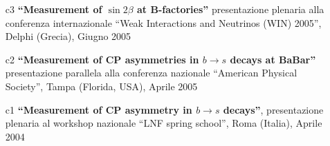 \documentclass[11pt,twoside,a4paper]{article}
\begin{document}
\begin{enumerate}
\item [c3] \textbf{``Measurement of $\sin 2\beta$ at B-factories''}
  presentazione plenaria alla conferenza internazionale ``Weak
  Interactions and Neutrinos (WIN) 2005'', Delphi (Grecia), Giugno
  2005
  \vspace{1mm}

\item [c2] \textbf{``Measurement of CP asymmetries in $b \rightarrow s$
  decays at BaBar''} presentazione parallela alla conferenza
  nazionale ``American Physical Society'', Tampa (Florida, USA),
  Aprile 2005
  \vspace{1mm}

\item [c1] \textbf{``Measurement of CP asymmetry in $b \rightarrow s$
  decays''}, presentazione plenaria al workshop nazionale ``LNF spring
  school'', Roma (Italia), Aprile 2004
\end{enumerate}

  
\end{document}

